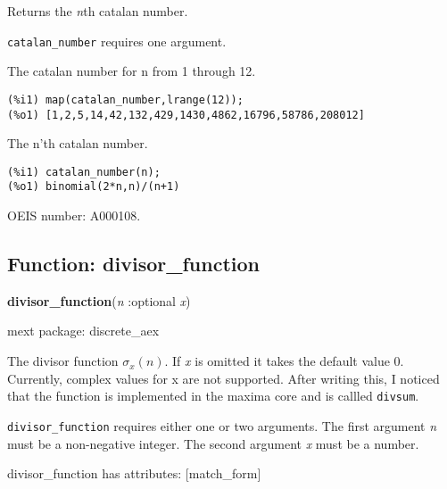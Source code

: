 \documentclass[]{article}
\begin{document}
\vspace{5 pt}
Returns the {\it n}th catalan number. 

\vspace{5 pt}

   {\tt catalan\_number} requires one argument.


\vspace{5 pt}


   The catalan number for n from 1 through 12. 

\begin{Verbatim}[frame=single]
(%i1) map(catalan_number,lrange(12));
(%o1) [1,2,5,14,42,132,429,1430,4862,16796,58786,208012]
\end{Verbatim}

   The n'th catalan number. 

\begin{Verbatim}[frame=single]
(%i1) catalan_number(n);
(%o1) binomial(2*n,n)/(n+1)
\end{Verbatim}


OEIS number: A000108.


\subsection{Function: divisor\_function\label{sec:divisor_function}}
\hypertarget{divisor_function}{}
{\bf divisor\_function}({\it n} :optional {\it x})


\noindent mext package: discrete\_aex



\vspace{5 pt}
The divisor function $\sigma_x(n)$. If {\it x} is omitted it takes the default value $0$. Currently, complex values for x are not supported. After writing this, I noticed that the function is implemented in the maxima core and is callled {\tt divsum}. 

\vspace{5 pt}

   {\tt divisor\_function} requires either one or two arguments.
    The first argument {\it n} must be a non-negative integer.
    The second argument {\it x} must be a number.


\vspace{5 pt}

divisor\_function has attributes: [match\_form]
\end{document}
